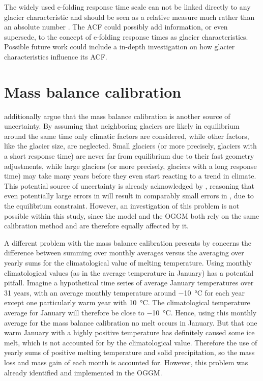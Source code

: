         The widely used e-folding response time scale can not be linked directly to any glacier characteristic and should be seen as a relative measure much rather than an absolute number \citep{Schuster2020}. The ACF could possibly add information, or even supersede, to the concept of e-folding response times as glacier characteristics.  Possible future work could include a in-depth investigation on how glacier characteristics influence its ACF.
 
    
    

    \section{Mass balance calibration} %
    \label{sec:mass_balance_calibration}

        \citet{Roe2020} additionally argue that the mass balance calibration is another source of uncertainty. By assuming that neighboring glaciers are likely in equilibrium around the same time only climatic factors are considered, while other factors, like the glacier size, are neglected. Small glaciers (or more precisely, glaciers with a short response time) are never far from equilibrium due to their fast geometry adjustments, while large glaciers (or more precisely, glaciers with a long response time) may take many years before they even start reacting to a trend in climate. This potential source of uncertainty is already acknowledged by \citet{Maussion2019}, reasoning that even potentially large errors in \tstar{} will result in comparably small errors in \mustar{}, due to the equilibrium constraint. However, an investigation of this problem is not possible within this study, since the \vas{} model and the OGGM both rely on the same calibration method and are therefore equally affected by it.

        A different problem with the mass balance calibration presents by \citet{Marzeion2012b} concerns the difference between summing over monthly averages versus the averaging over yearly sums for the climatological value of melting temperature.
        Using monthly climatological values (as in the average temperature in January) has a potential pitfall. Imagine a hypothetical time series of average January temperatures over 31 years, with an average monthly temperature  around \SI{-10}{\celsius} for each year except one particularly warm year with \SI{+10}{\celsius}. The climatological temperature average for January will therefore be close to \SI{-10}{\celsius}. Hence, using this monthly average for the mass balance calibration no melt occurs in January. But that one warm January with a highly positive temperature has definitely caused some ice melt, which is not accounted for by the climatological value. Therefore the use of yearly sums of positive melting temperature and solid precipitation, so the mass loss and mass gain of each month is accounted for. However, this problem was already identified and implemented in the OGGM.
    
